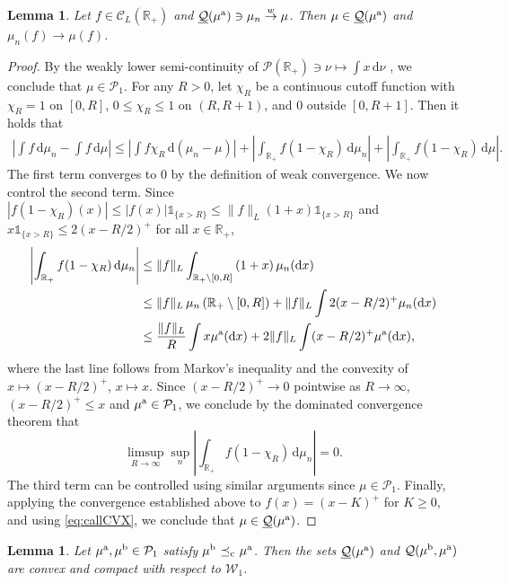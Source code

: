 \documentclass[11pt]{article}
\newcommand{\cC}{\mathcal{C}}
\newcommand{\cP}{\mathcal{P}}
\newcommand{\cQ}{\mathcal{Q}}
\newcommand{\cW}{\mathcal{W}}
\newcommand{\R}{\mathbb{R}} %
\theoremstyle{plain}
\newtheorem{lemma}[theorem]{Lemma}
\theoremstyle{definition}
\theoremstyle{remark}
\newcommand*{\rd}{\mathrm{d}}
\newcommand*{\dd}{\, \rd}
\DeclareMathOperator{\cleq}{\,\preceq_{\rm c}\,}
\theoremstyle{plain}
\begin{document}
\begin{lemma}\label{lemma:continuity}
Let $f\in \cC_L(\R_+)$ and $\underline{\cQ}(\mu^{\rm a}) \ni \mu_n \overset{w}{\to} \mu$. Then $\mu \in  \underline{\cQ}(\mu^{\rm a}) $ and $\mu_n(f) \to \mu(f)$.
%
%
%
\end{lemma}
\begin{proof}
%
By the weakly lower semi-continuity of $\cP(\R_+)\ni \nu \mapsto \int x \dd \nu$ \citep[see, e.g.,][Proposition~7.1]{santambrogio2015optimal}, we conclude that $\mu \in \cP_1$. For any $R>0$, let $\chi_R$ be a continuous cutoff function with $\chi_R =1$ on $[0,R]$, $0\leq \chi_R\leq 1$ on $(R,R+1)$, and $0$ outside $[0,R+1]$. Then it holds that
\begin{align*}
    \left|\int f\dd \mu_n - \int f\dd \mu\right| \leq  \left|\int f\chi_R \dd (\mu_n- \mu)\right| + \left|\int_{\R_+} f(1-\chi_R)\dd \mu_n\right| + \left|\int_{\R_+} f(1-\chi_R)\dd \mu\right|.
\end{align*}
The first term converges to 0 by the definition of weak convergence. We now control the second term. Since $|f(1-\chi_R)(x)| \leq |f(x)|\mathds{1}_{\{x>R\}}\leq \lVert f \rVert_{L}(1+x) \mathds{1}_{\{x>R\}}$ and  $x\mathds{1}_{\{x>R\}} \leq 2(x - R/2)^+$ for all $x\in \R_+$, %
\begin{align*}
    \left|\int_{\R_+} f(1-\chi_R)\dd \mu_n\right| &\leq  \lVert f \rVert_{L} \int_{\R_+\setminus [0,R]}\left(1+x\right)\mu_n(\rd x)\\
    & \leq  \lVert f \rVert_{L} \,\mu_n\left(\R_+\setminus[0,R]\right) +  \lVert f \rVert_{L}\int 2(x-R/2)^+ \mu_n(\rd x)\\
    & \leq \frac{\lVert f \rVert_{L}}{R}\int x\mu^{\rm a}(\rd x) + 2\lVert f \rVert_{L}\int (x-R/2)^+ \mu^{\rm a}(\rd x),
\end{align*}
where the last line follows from Markov's inequality and the convexity of $x \mapsto (x - R/2)^+$, $x\mapsto x$. 
 Since $(x - R/2)^+ \to 0$ pointwise as  $R\to \infty$, $(x - R/2)^+ \leq x$ and $\mu^{\rm a} \in \cP_1$, we conclude by the dominated convergence theorem that
 \[
\limsup_{R\to \infty} \sup_{n}  \left|\int_{\R_+} f(1-\chi_R)\dd \mu_n\right|=0.
 \]
The third term can be controlled using similar arguments since $\mu \in \cP_1$. 
Finally, applying the convergence established above to $f(x)=(x-K)^+$ for $K\geq 0$, and using \eqref{eq:callCVX}, we conclude that $\mu\in\underline{\cQ}(\mu^{\rm a})$.
\end{proof}

\begin{lemma}\label{lemma:convex-order-topology}
    Let $\mu^{\rm a}, \mu^{\rm b} \in \cP_1$ satisfy $\mu^{\rm b} \cleq \mu^{\rm a}$. Then the sets  $\underline{\cQ}( \mu^{\rm a})$ and $\cQ(\mu^{\rm b}, \mu^{\rm a})$ are convex and  compact with respect to $\cW_1$. 
\end{lemma}
%
%
%
%
%
\end{document}
